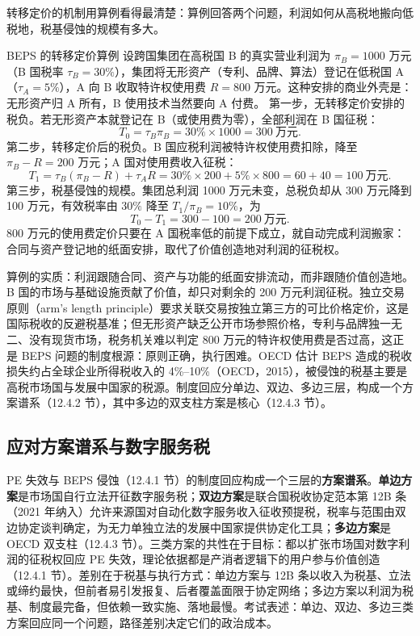 转移定价的机制用算例看得最清楚：算例回答两个问题，利润如何从高税地搬向低税地，税基侵蚀的规模有多大。

\begin{derivation}{BEPS 的转移定价算例}{}
设跨国集团在高税国 B 的真实营业利润为 $\pi_B = 1000$ 万元（B 国税率 $\tau_B = 30\%$），集团将无形资产（专利、品牌、算法）登记在低税国 A（$\tau_A = 5\%$），A 向 B 收取特许权使用费 $R = 800$ 万元。这种安排的商业外壳是：无形资产归 A 所有，B 使用技术当然要向 A 付费。
第一步，无转移定价安排的税负。若无形资产本就登记在 B（或使用费为零），全部利润在 B 国征税：
\[
T_0 = \tau_B \pi_B = 30\% \times 1000 = 300 \ \text{万元}.
\]
第二步，转移定价后的税负。B 国应税利润被特许权使用费扣除，降至 $\pi_B - R = 200$ 万元；A 国对使用费收入征税：
\[
T_1 = \tau_B (\pi_B - R) + \tau_A R = 30\% \times 200 + 5\% \times 800 = 60 + 40 = 100 \ \text{万元}.
\]
第三步，税基侵蚀的规模。集团总利润 1000 万元未变，总税负却从 300 万元降到 100 万元，有效税率由 $30\%$ 降至 $T_1 / \pi_B = 10\%$，为
\[
T_0 - T_1 = 300 - 100 = 200 \ \text{万元}.
\]
800 万元的使用费定价只要在 A 国税率低的前提下成立，就自动完成利润搬家：合同与资产登记地的纸面安排，取代了价值创造地对利润的征税权。
\end{derivation}

算例的实质：利润跟随合同、资产与功能的纸面安排流动，而非跟随价值创造地。B 国的市场与基础设施贡献了价值，却只对剩余的 200 万元利润征税。独立交易原则（arm's length principle）要求关联交易按独立第三方的可比价格定价，这是国际税收的反避税基准；但无形资产缺乏公开市场参照价格，专利与品牌独一无二、没有现货市场，税务机关难以判定 800 万元的特许权使用费是否过高，这正是 BEPS 问题的制度根源：原则正确，执行困难。OECD 估计 BEPS 造成的税收损失约占全球企业所得税收入的 4\%--10\%（OECD，2015），被侵蚀的税基主要是高税市场国与发展中国家的税源。制度回应分单边、双边、多边三层，构成一个方案谱系（12.4.2 节），其中多边的双支柱方案是核心（12.4.3 节）。

\subsection{应对方案谱系与数字服务税}

PE 失效与 BEPS 侵蚀（12.4.1 节）的制度回应构成一个三层的\textbf{方案谱系}。\textbf{单边方案}是市场国自行立法开征数字服务税；\textbf{双边方案}是联合国税收协定范本第 12B 条（2021 年纳入）允许来源国对自动化数字服务收入征收预提税，税率与范围由双边协定谈判确定，为无力单独立法的发展中国家提供协定化工具；\textbf{多边方案}是 OECD 双支柱（12.4.3 节）。三类方案的共性在于目标：都以扩张市场国对数字利润的征税权回应 PE 失效，理论依据都是产消者逻辑下的用户参与价值创造（12.4.1 节）。差别在于税基与执行方式：单边方案与 12B 条以收入为税基、立法或缔约最快，但前者易引发报复、后者覆盖面限于协定网络；多边方案以利润为税基、制度最完备，但依赖一致实施、落地最慢。考试表述：单边、双边、多边三类方案回应同一个问题，路径差别决定它们的政治成本。

